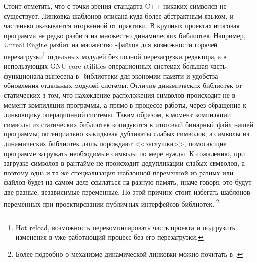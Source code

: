 Стоит отметить, что с точки зрения стандарта C++ никаких символов не существует.
Линковка шаблонов описана куда более абстрактным языком, и частенько оказывается оторванной от практики.
В крупных проектах итоговая программа не редко разбита на множество динамических библиотек.
Например, Unreal Engine разбит на множество -файлов для возможности горячей перезагрузки\footnote{Hot reload, возможность перекомпилировать часть проекта и подгрузить изменения в уже работающий процесс без его перезагрузки.} отдельных модулей без полной перезагрузки редактора, а в использующих GNU core utilities операционных системах б\'{о}льшая часть функционала вынесена в -библиотеки для экономии памяти и удобства обновления отдельных модулей системы.
Отличие динамических библиотек от статических в том, что нахождение расположения символов происходит не в момент компиляции программы, а прямо в процессе работы, через обращение к линковщику операционной системы.
Таким образом, в момент компиляции символы из статических библиотек копируются в итоговый бинарный файл нашей программы, потенциально выкидывая дубликаты слабых символов, а символы из динамических библиотек лишь порождают <<заглушки>>, помогающие программе загружать необходимые символы по мере нужды.
К сожалению, при загрузке символов в рантайме не происходит дедупликации слабых символов, а поэтому одна и та же специализация шаблонной переменной из разных  или  файлов будет на самом деле ссылаться на разную память, иначе говоря, это будут две разные, независимые переменные.
По этой причине стоит избегать шаблонов переменных при проектировании публичных интерфейсов библиотек.
\footnote{Более подробно о механизме динамической линковки можно почитать в \cite{DynamicLinking}.}


